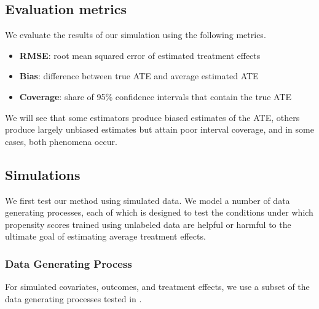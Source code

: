 \documentclass[aos]{imsart}
\begin{document}
\subsection{Evaluation metrics}

We evaluate the results of our simulation using the following metrics.

\begin{itemize}
	\item \textbf{RMSE}: root mean squared error of estimated treatment effects
	\item \textbf{Bias}: difference between true ATE and average estimated ATE
	\item \textbf{Coverage}: share of 95\% confidence intervals that contain the true ATE
\end{itemize}

We will see that some estimators produce biased estimates of the ATE, others produce largely unbiased estimates
but attain poor interval coverage, and in some cases, both phenomena occur. 

\subsection{Simulations}
\label{section:simstudy}

We first test our method using simulated data. We model a number of data generating processes, each of which is designed to 
test the conditions under which propensity scores trained using unlabeled data are helpful or harmful to the ultimate
goal of estimating average treatment effects.

\subsubsection{Data Generating Process}

For simulated covariates, outcomes, and treatment effects, we use a subset of the data generating processes tested in \cite{hahn2020bayesian}. 
\end{document}
